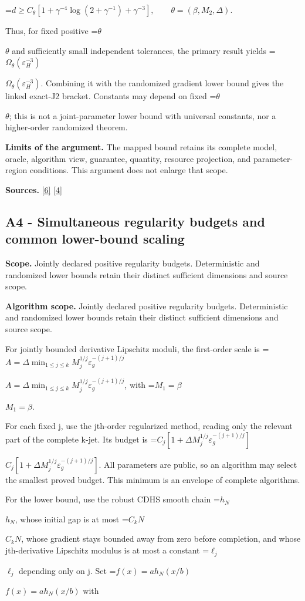 \documentclass[10pt,a4paper]{article}
\newcommand{\AtlasMath}[1]{\par\begingroup\centering\setbox0=\hbox{$\displaystyle #1$}\ifdim\wd0>1.4\linewidth\typeout{ATLAS WIDE FORMULA: \the\wd0}\fi\ifdim\wd0>\linewidth\resizebox{\linewidth}{!}{\box0}\else\box0\fi\par\endgroup}
\newcommand{\AtlasInlineMath}[1]{\begingroup\setbox0=\hbox{$#1$}\ifdim\wd0>.4\linewidth\endgroup\AtlasMath{#1}\else\endgroup$#1$\fi}
\begin{document}
\AtlasMath{d\ge C_\theta[1+\gamma^{-4}\log(2+\gamma^{-1})+\gamma^{-3}],\qquad\theta=(\beta,M_2,\Delta).}

Thus, for fixed positive \AtlasInlineMath{\theta} and sufficiently small independent tolerances, the primary result yields \AtlasInlineMath{\Omega_{\theta}(\varepsilon_H^{-3})}. Combining it with the randomized gradient lower bound gives the linked exact-J2 bracket. Constants may depend on fixed \AtlasInlineMath{\theta}; this is not a joint-parameter lower bound with universal constants, nor a higher-order randomized theorem.

\textbf{Limits of the argument.} The mapped bound retains its complete model, oracle, algorithm view, guarantee, quantity, resource projection, and parameter-region conditions. This argument does not enlarge that scope.

\textbf{Sources.} \href{https://proceedings.mlr.press/v125/arjevani20a/arjevani20a.pdf}{[6]} \href{https://arxiv.org/abs/2610.16832}{[4]}

\subsection{A4 - Simultaneous regularity budgets and common lower-bound scaling}
\textbf{Scope.} Jointly declared positive regularity budgets. Deterministic and randomized lower bounds retain their distinct sufficient dimensions and source scope.

\textbf{Algorithm scope.} Jointly declared positive regularity budgets. Deterministic and randomized lower bounds retain their distinct sufficient dimensions and source scope.

For jointly bounded derivative Lipschitz moduli, the first-order scale is \AtlasInlineMath{A=\Delta\min_{1\le j\le k}M_j^{1/j}\varepsilon_g^{-(j+1)/j}}, with \AtlasInlineMath{M_1=\beta}.

For each fixed j, use the jth-order regularized method, reading only the relevant part of the complete k-jet. Its budget is \AtlasInlineMath{C_j[1+\Delta M_j^{1/j}\varepsilon_g^{-(j+1)/j}]}. All parameters are public, so an algorithm may select the smallest proved budget. This minimum is an envelope of complete algorithms.

For the lower bound, use the robust CDHS smooth chain \AtlasInlineMath{h_N}, whose initial gap is at most \AtlasInlineMath{C_kN}, whose gradient stays bounded away from zero before completion, and whose jth-derivative Lipschitz modulus is at most a constant \AtlasInlineMath{\ell_j} depending only on j. Set \AtlasInlineMath{f(x)=a h_N(x/b)} with
\end{document}
